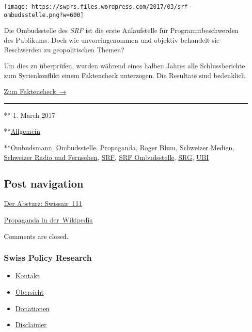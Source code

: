 \texttt{[image: https://swprs.files.wordpress.com/2017/03/srf-ombudsstelle.png?w=600]}

Die Ombudsstelle des \emph{SRF} ist die erste Anlaufstelle für
Programm­be­schwerden des Publi­kums. Doch wie un­vor­ein­ge­nommen und
objektiv behandelt sie Beschwerden zu geo­po­li­tischen Themen?

Um dies zu über­prüfen, wurden während eines halben Jahres alle
Schluss­be­richte zum Syrien­kon­flikt einem Fakten­check unter­zogen.
Die Resul­tate sind bedenk­lich.

\href{https://swprs.org/srf-ombudsstelle-im-faktencheck/}{Zum
Faktencheck~→}

\begin{center}\rule{0.5\linewidth}{\linethickness}\end{center}

** 1. March 2017

**\href{https://swprs.org/category/allgemein/}{Allgemein}

**\href{https://swprs.org/tag/ombudsmann/}{Ombudsmann},
\href{https://swprs.org/tag/ombudsstelle/}{Ombudsstelle},
\href{https://swprs.org/tag/propaganda/}{Propaganda},
\href{https://swprs.org/tag/roger-blum/}{Roger Blum},
\href{https://swprs.org/tag/schweizer-medien/}{Schweizer Medien},
\href{https://swprs.org/tag/schweizer-radio-und-fernsehen/}{Schweizer
Radio und Fernsehen}, \href{https://swprs.org/tag/srf/}{SRF},
\href{https://swprs.org/tag/srf-ombudsstelle/}{SRF Ombudsstelle},
\href{https://swprs.org/tag/srg/}{SRG},
\href{https://swprs.org/tag/ubi/}{UBI}

\hypertarget{post-navigation}{%
\subsection{Post navigation}\label{post-navigation}}

\href{https://swprs.org/2017/03/01/der-absturz-swissair-111/}{Der
Absturz: Swissair~111}

\href{https://swprs.org/2017/03/01/propaganda-in-der-wikipedia/}{Propaganda
in der~Wikipedia}

Comments are closed.

\hypertarget{swiss-policy-research}{%
\subsubsection{Swiss Policy Research}\label{swiss-policy-research}}

\begin{itemize}
\tightlist
\item
  \href{https://swprs.org/kontakt/}{Kontakt}
\item
  \href{https://swprs.org/uebersicht/}{Übersicht}
\item
  \href{https://swprs.org/donationen/}{Donationen}
\item
  \href{https://swprs.org/disclaimer/}{Disclaimer}
\end{itemize}

